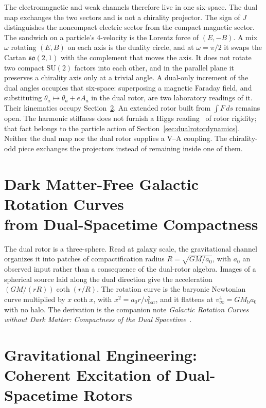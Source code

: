 \documentclass[a4paper]{article}
\begin{document}
The electromagnetic and weak channels therefore live in one six-space. The dual map exchanges the two sectors and is not a chirality projector. The sign of $J$ distinguishes the noncompact electric sector from the compact magnetic sector. The sandwich on a particle's 4-velocity is the Lorentz force of $(E,-B)$. A mix $\omega$ rotating $(E,B)$ on each axis is the duality circle, and at $\omega=\pi/2$ it swaps the Cartan $\mathfrak{so}(2,1)$ with the complement that moves the axis. It does not rotate two compact $\mathrm{SU}(2)$ factors into each other, and in the parallel plane it preserves a chirality axis only at a trivial angle. A dual-only increment of the dual angles occupies that six-space: superposing a magnetic Faraday field, and substituting $\theta_a\mapsto\theta_a+e A_a$ in the dual rotor, are two laboratory readings of it. Their kinematics occupy Section~\ref{sec:gravitycontrol}. An extended rotor built from $\int F\,ds$ remains open. The harmonic stiffness does not furnish a Higgs reading~\cite{higgs1964} of rotor rigidity; that fact belongs to the particle action of Section~\ref{sec:dualrotordynamics}. Neither the dual map nor the dual rotor supplies a V--A coupling. The chirality-odd piece exchanges the projectors instead of remaining inside one of them.

\section[Dark Matter-Free Galactic Rotation Curves from Dual-Spacetime Compactness]{%
Dark Matter-Free Galactic Rotation Curves\\%
from Dual-Spacetime Compactness}
\label{sec:darkmatter}

The dual rotor is a three-sphere. Read at galaxy scale, the gravitational channel organizes it into patches of compactification radius $R=\sqrt{GM/a_0}$, with $a_0$ an observed input rather than a consequence of the dual-rotor algebra. Images of a spherical source laid along the dual direction give the acceleration $(GM/(rR))\coth(r/R)$. The rotation curve is the baryonic Newtonian curve multiplied by $x\coth x$, with $x^2=a_0 r/v_{\mathrm{bar}}^2$, and it flattens at $v_\infty^4=GM_{\mathrm{b}}a_0$ with no halo. The derivation is the companion note \emph{Galactic Rotation Curves without Dark Matter: Compactness of the Dual Spacetime}~\cite{dst-galactic}.

\section[Gravitational Engineering: Coherent Excitation of Dual-Spacetime Rotors]{%
Gravitational Engineering:\\%
Coherent Excitation of Dual-Spacetime Rotors}
\label{sec:gravitycontrol}
\end{document}
